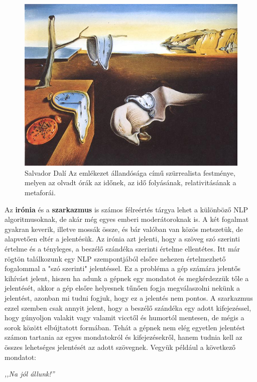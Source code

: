 \begin{figure}[h]
\centering
\includegraphics[scale=0.5]{images/metaphor.jpg}
\caption{Salvador Dalí Az emlékezet állandósága című szürrealista festménye, melyen az olvadt órák az időnek, az idő folyásának, relativitásának a metaforái.}
\label{fig:metaphor}
\end{figure}

Az \textbf{irónia} és a \textbf{szarkazmus} is számos félreértés tárgya lehet a különböző NLP algoritmusoknak, de akár még egyes emberi moderátoroknak is. A két fogalmat gyakran keverik, illetve mossák össze, és bár valóban van közös metszetük, de alapvetően eltér a jelentésük. Az irónia azt jelenti, hogy a szöveg szó szerinti értelme és a tényleges, a beszélő szándéka szerinti értelme ellentétes. Itt már rögtön találkozunk egy NLP szempontjából elsőre nehezen értelmezhető fogalommal a "szó szerinti" jelentéssel. Ez a probléma a gép számára jelentős kihívást jelent, hiszen ha adunk a gépnek egy mondatot és megkérdezzük tőle a jelentését, akkor a gép elsőre helyesnek tűnően fogja megválaszolni nekünk a jelentést, azonban mi tudni fogjuk, hogy ez a jelentés nem pontos. A szarkazmus ezzel szemben csak annyit jelent, hogy a beszélő szándéka egy adott kifejezéssel, hogy gúnyoljon valakit vagy valamit vicctől és humortól mentesen, de mégis a sorok között elbújtatott formában. Tehát a gépnek nem elég egyetlen jelentést számon tartania az egyes mondatokról és kifejezésekről, hanem tudnia kell az összes lehetséges jelentését az adott szövegnek. Vegyük például a következő mondatot:

\vspace{0.5cm}
\centerline{\textit{,,Na jól állunk!''}}
\vspace{0.5cm}

